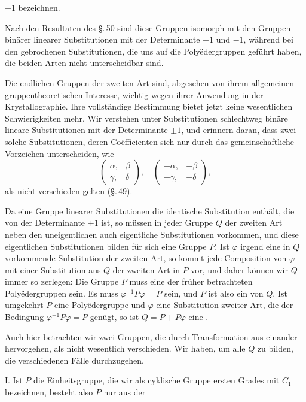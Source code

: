 
 $-1$  bezeichnen.

Nach den Resultaten des \S.\,50 sind diese Gruppen isomorph mit den Gruppen bin\"arer linearer Substitutionen mit der Determinante $+1$ und $-1$, w\"ahrend bei den gebrochenen Substitutionen, die uns auf die Poly\"edergruppen gef\"uhrt haben, die beiden Arten nicht unterscheidbar sind.

Die endlichen Gruppen der zweiten Art sind, abgesehen von ihrem allgemeinen gruppentheoretischen Interesse, wichtig wegen ihrer Anwendung in der Krystallographie. Ihre vollst\"andige Bestimmung bietet jetzt keine wesentlichen Schwierigkeiten mehr. Wir verstehen unter Substitutionen schlechtweg bin\"are lineare Substitutionen mit der Determinante $\pm 1$, und erinnern daran, dass zwei solche Substitutionen, deren Coëfficienten sich nur durch das gemeinschaftliche Vorzeichen unterscheiden, wie
\[
\begin{pmatrix} \alpha, & \beta \\ \gamma, & \delta \end{pmatrix}, \quad
\begin{pmatrix} -\alpha, & -\beta \\ -\gamma, & -\delta \end{pmatrix},
\]
als nicht verschieden gelten (\S.\,49).

Da eine Gruppe linearer Substitutionen die identische Substitution enth\"alt, die von der Determinante $+1$ ist, so m\"ussen in jeder Gruppe $Q$ der zweiten Art neben den uneigentlichen auch eigentliche Substitutionen vorkommen, und diese eigentlichen Substitutionen bilden f\"ur sich eine Gruppe $P$. Ist $\varphi$ irgend eine in $Q$ vorkommende Substitution der zweiten Art, so kommt jede Composition von $\varphi$ mit einer Substitution aus $Q$ der zweiten Art in $P$ vor, und daher k\"onnen wir $Q$ immer so zerlegen:
Die Gruppe $P$ muss eine der fr\"uher betrachteten Poly\"edergruppen sein. Es muss $\varphi^{-1}P\varphi = P$ sein, und $P$ ist also ein  von $Q$. Ist umgekehrt $P$ eine Poly\"edergruppe und $\varphi$ eine Substitution zweiter Art, die der Bedingung $\varphi^{-1}P\varphi = P$ gen\"ugt, so ist $Q = P + P\varphi$ eine .

Auch hier betrachten wir zwei Gruppen, die durch Transformation aus einander hervorgehen, als nicht wesentlich verschieden. Wir haben, um alle $Q$ zu bilden, die verschiedenen F\"alle durchzugehen.

I. Ist $P$ die Einheitsgruppe, die wir als cyklische Gruppe ersten Grades mit $C_1$ bezeichnen, besteht also $P$ nur aus der
